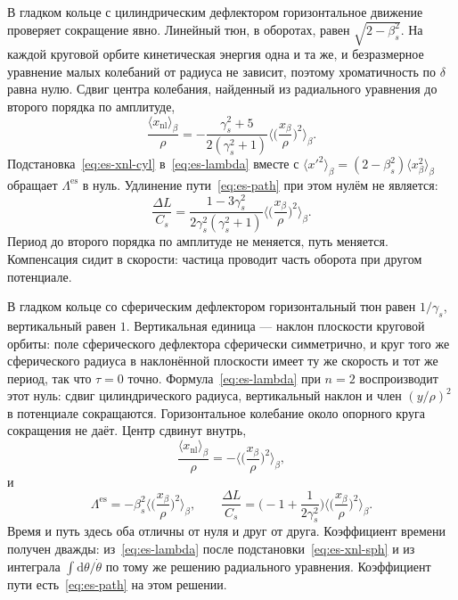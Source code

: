В гладком кольце с цилиндрическим дефлектором горизонтальное движение проверяет сокращение явно. Линейный тюн, в оборотах, равен $\sqrt{2-\beta_s^2}$. На каждой круговой орбите кинетическая энергия одна и та же, и безразмерное уравнение малых колебаний от радиуса не зависит, поэтому хроматичность по $\delta$ равна нулю. Сдвиг центра колебания, найденный из радиального уравнения до второго порядка по амплитуде,
\begin{equation}
\label{eq:es-xnl-cyl}
\frac{\langle x_{\mathrm{nl}}\rangle_\beta}{\rho}
=-\frac{\gamma_s^2+5}{2(\gamma_s^2+1)}
\Biggl\langle\Biggl(\frac{x_\beta}{\rho}\Biggr)^2\Biggr\rangle_\beta.
\end{equation}
Подстановка~\eqref{eq:es-xnl-cyl} в~\eqref{eq:es-lambda} вместе с $\langle x'^2\rangle_\beta=(2-\beta_s^2)\langle x_\beta^2\rangle_\beta$ обращает $\Lambda^{\mathrm{es}}$ в нуль. Удлинение пути~\eqref{eq:es-path} при этом нулём не является:
\begin{equation}
\label{eq:es-path-cyl}
\frac{\Delta L}{C_s}
=\frac{1-3\gamma_s^2}{2\gamma_s^2(\gamma_s^2+1)}
\Biggl\langle\Biggl(\frac{x_\beta}{\rho}\Biggr)^2\Biggr\rangle_\beta.
\end{equation}
Период до второго порядка по амплитуде не меняется, путь меняется. Компенсация сидит в скорости: частица проводит часть оборота при другом потенциале.

В гладком кольце со сферическим дефлектором горизонтальный тюн равен $1/\gamma_s$, вертикальный равен $1$. Вертикальная единица --- наклон плоскости круговой орбиты: поле сферического дефлектора сферически симметрично, и круг того же сферического радиуса в наклонённой плоскости имеет ту же скорость и тот же период, так что $\tau=0$ точно. Формула~\eqref{eq:es-lambda} при $n=2$ воспроизводит этот нуль: сдвиг цилиндрического радиуса, вертикальный наклон и член $(y/\rho)^2$ в потенциале сокращаются. Горизонтальное колебание около опорного круга сокращения не даёт. Центр сдвинут внутрь,
\begin{equation}
\label{eq:es-xnl-sph}
\frac{\langle x_{\mathrm{nl}}\rangle_\beta}{\rho}
=-\Biggl\langle\Biggl(\frac{x_\beta}{\rho}\Biggr)^2\Biggr\rangle_\beta,
\end{equation}
и
\begin{equation}
\label{eq:es-lam-sph}
\Lambda^{\mathrm{es}}=-\beta_s^2\Biggl\langle\Biggl(\frac{x_\beta}{\rho}\Biggr)^2\Biggr\rangle_\beta,
\qquad
\frac{\Delta L}{C_s}
=\Biggl(-1+\frac{1}{2\gamma_s^2}\Biggr)
\Biggl\langle\Biggl(\frac{x_\beta}{\rho}\Biggr)^2\Biggr\rangle_\beta.
\end{equation}
Время и путь здесь оба отличны от нуля и друг от друга. Коэффициент времени получен дважды: из~\eqref{eq:es-lambda} после подстановки~\eqref{eq:es-xnl-sph} и из интеграла $\int\mathrm{d}\theta/\dot\theta$ по тому же решению радиального уравнения. Коэффициент пути есть~\eqref{eq:es-path} на этом решении.

